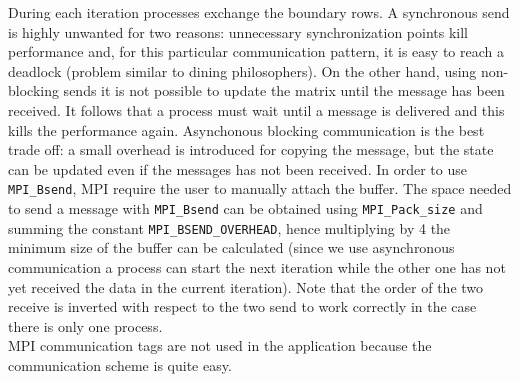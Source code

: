 \documentclass{article}
\begin{document}
During each iteration processes exchange the boundary rows. A synchronous send is highly unwanted for two reasons: unnecessary synchronization points kill performance and, for this particular communication pattern, it is easy to reach a deadlock (problem similar to dining philosophers). On the other hand, using non-blocking sends it is not possible to update the matrix until the message has been received. It follows that a process must wait until a message is delivered and this kills the performance again. Asynchonous blocking communication is the best trade off: a small overhead is introduced for copying the message, but the state can be updated even if the messages has not been received. In order to use \texttt{MPI\_Bsend}, MPI require the user to manually attach the buffer. The space needed to send a message with \texttt{MPI\_Bsend} can be obtained using \texttt{MPI\_Pack\_size} and summing the constant \texttt{MPI\_BSEND\_OVERHEAD}, hence multiplying by 4 the minimum size of the buffer can be calculated (since we use asynchronous communication a process can start the next iteration while the other one has not yet received the data in the current iteration). Note that the order of the two receive is inverted with respect to the two send to work correctly in the case there is only one process. \\
MPI communication tags are not used in the application because the communication scheme is quite easy.
\end{document}
